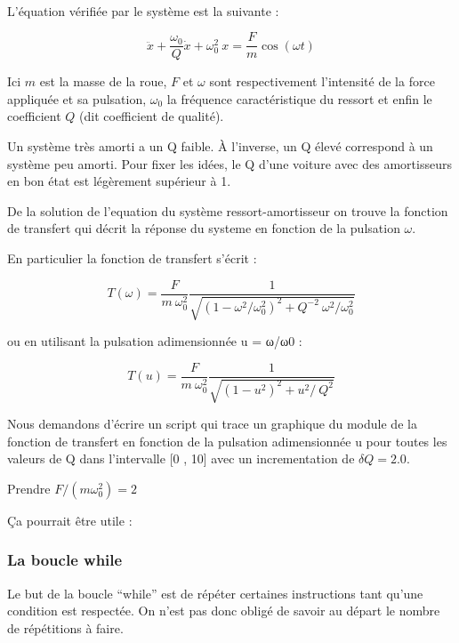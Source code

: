 \documentclass{article}
\begin{document}
    \begin{center}
    \end{center}
    { \hspace*{\fill} \\}
    

    L'équation vérifiée par le système est la suivante :

\[ \ddot{x} + \frac{\omega_0}{Q} \dot{x} + \omega_0^2\ x = \frac{F}{m} \cos( \omega t) \]

    Ici \(m\) est la masse de la roue, \(F\) et \(\omega\) sont
respectivement l'intensité de la force appliquée et sa pulsation,
\(\omega_0\) la fréquence caractéristique du ressort et enfin le
coefficient \(Q\) (dit coefficient de qualité).

Un système très amorti a un Q faible. À l'inverse, un Q élevé correspond
à un système peu amorti. Pour fixer les idées, le Q d'une voiture avec
des amortisseurs en bon état est légèrement supérieur à 1.

    De la solution de l'equation du système ressort-amortisseur on trouve la
fonction de transfert qui décrit la réponse du systeme en fonction de la
pulsation \(\omega\).

En particulier la fonction de transfert s'écrit :

    \[ T(\omega) = \frac{F}{m \ \omega_0^2} \frac{1}{\sqrt{ \left( 1 - \omega^2/\omega_0^2 \right)^2 +  Q^{-2} \ \omega^2/\omega_0^2 }} \]

    ou en utilisant la pulsation adimensionnée u = ω/ω0 :

    \[ T(u) = \frac{F}{m \ \omega_0^2} \frac{1}{\sqrt{ \left( 1 - u^2 \right)^2 +  u^{2}/ \      Q^2}} \]

    Nous demandons d'écrire un script qui trace un graphique du module de la
fonction de transfert en fonction de la pulsation adimensionnée u pour
toutes les valeurs de Q dans l'intervalle {[}0 , 10{]} avec un
incrementation de \(\delta Q = 2.0\).

    Prendre $ F / (m \omega_0^{2} ) = 2 $

    Ça pourrait être utile :


    \subsubsection{La boucle while}


    Le but de la boucle ``while'' est de répéter certaines instructions tant
qu'une condition est respectée. On n'est pas donc obligé de savoir au
départ le nombre de répétitions à faire.
\end{document}
